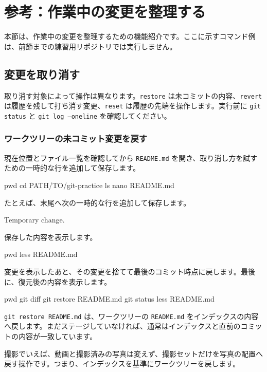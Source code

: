 \documentclass[a4paper,11pt]{jlreq}
\newcommand{\cmd}[1]{\texttt{#1}}
\begin{document}
\section{参考：作業中の変更を整理する}

本節は、作業中の変更を整理するための機能紹介です。ここに示すコマンド例は、前節までの練習用リポジトリでは実行しません。

\subsection{変更を取り消す}

取り消す対象によって操作は異なります。\cmd{restore} は未コミットの内容、\cmd{revert} は履歴を残して打ち消す変更、\cmd{reset} は履歴の先端を操作します。実行前に \cmd{git status} と \cmd{git log --oneline} を確認してください。

\subsubsection{ワークツリーの未コミット変更を戻す}

現在位置とファイル一覧を確認してから \cmd{README.md} を開き、取り消し方を試すための一時的な行を追加して保存します。

\begin{codeblock}
pwd
cd PATH/TO/git-practice
ls
nano README.md
\end{codeblock}

たとえば、末尾へ次の一時的な行を追加して保存します。

\begin{codeblock}
Temporary change.
\end{codeblock}

保存した内容を表示します。

\begin{codeblock}
pwd
less README.md
\end{codeblock}

変更を表示したあと、その変更を捨てて最後のコミット時点に戻します。最後に、復元後の内容を表示します。

\begin{codeblock}
pwd
git diff
git restore README.md
git status
less README.md
\end{codeblock}

\cmd{git restore README.md} は、ワークツリーの \cmd{README.md} をインデックスの内容へ戻します。まだステージしていなければ、通常はインデックスと直前のコミットの内容が一致しています。

撮影でいえば、動画と撮影済みの写真は変えず、撮影セットだけを写真の配置へ戻す操作です。つまり、インデックスを基準にワークツリーを戻します。
\end{document}
